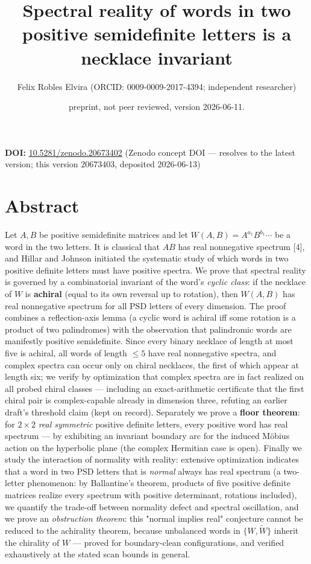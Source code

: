 \documentclass[11pt]{article}
\title{Spectral reality of words in two positive semidefinite letters is a necklace invariant}
\author{Felix Robles Elvira (ORCID: 0009-0009-2017-4394; independent researcher)}
\date{\small preprint, not peer reviewed, version 2026-06-11.}
\begin{document}
\maketitle

\textbf{DOI:} \href{https://doi.org/10.5281/zenodo.20673402}{10.5281/zenodo.20673402} (Zenodo concept DOI — resolves to the latest version; this version 20673403, deposited 2026-06-13)

\section*{Abstract}
Let $A, B$ be positive semidefinite matrices and let $W(A,B) = A^{a_1}B^{b_1}\cdots$ be a word in the two letters.  It is classical that $AB$ has real nonnegative spectrum [4], and Hillar and Johnson initiated the systematic study of which words in two positive definite letters must have positive spectra.  We prove that spectral reality is governed by a combinatorial invariant of the word's \emph{cyclic class}: if the necklace of $W$ is \textbf{achiral} (equal to its own reversal up to rotation), then $W(A,B)$ has real nonnegative spectrum for all PSD letters of every dimension.  The proof combines a reflection-axis lemma (a cyclic word is achiral iff some rotation is a product of two palindromes) with the observation that palindromic words are manifestly positive semidefinite.  Since every binary necklace of length at most five is achiral, all words of length $\le 5$ have real nonnegative spectra, and complex spectra can occur only on chiral necklaces, the first of which appear at length six; we verify by optimization that complex spectra are in fact realized on all probed chiral classes — including an exact-arithmetic certificate that the first chiral pair is complex-capable already in dimension three, refuting an earlier draft's threshold claim (kept on record).  Separately we prove a \textbf{floor theorem}: for $2\times 2$ \emph{real symmetric} positive definite letters, every positive word has real spectrum — by exhibiting an invariant boundary arc for the induced Möbius action on the hyperbolic plane (the complex Hermitian case is open). Finally we study the interaction of normality with reality: extensive optimization indicates that a word in two PSD letters that is \emph{normal} always has real spectrum (a two-letter phenomenon: by Ballantine's theorem, products of five positive definite matrices realize every spectrum with positive determinant, rotations included), we quantify the trade-off between normality defect and spectral oscillation, and we prove an \emph{obstruction theorem}: this "normal implies real" conjecture cannot be reduced to the achirality theorem, because unbalanced words in $\{W, \widetilde W\}$ inherit the chirality of $W$ — proved for boundary-clean configurations, and verified exhaustively at the stated scan bounds in general.
\end{document}
